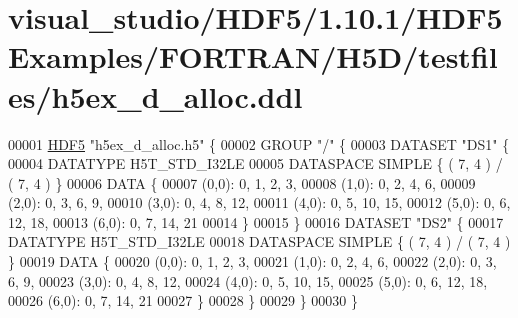 \hypertarget{visual__studio_2_h_d_f5_21_810_81_2_h_d_f5_examples_2_f_o_r_t_r_a_n_2_h5_d_2testfiles_2h5ex__d__alloc_8ddl_source}{}\section{visual\+\_\+studio/\+H\+D\+F5/1.10.1/\+H\+D\+F5\+Examples/\+F\+O\+R\+T\+R\+A\+N/\+H5\+D/testfiles/h5ex\+\_\+d\+\_\+alloc.ddl}
\label{visual__studio_2_h_d_f5_21_810_81_2_h_d_f5_examples_2_f_o_r_t_r_a_n_2_h5_d_2testfiles_2h5ex__d__alloc_8ddl_source}

\begin{DoxyCode}
00001 \hyperlink{namespace_h_d_f5}{HDF5} \textcolor{stringliteral}{"h5ex\_d\_alloc.h5"} \{
00002 GROUP \textcolor{stringliteral}{"/"} \{
00003    DATASET \textcolor{stringliteral}{"DS1"} \{
00004       DATATYPE  H5T\_STD\_I32LE
00005       DATASPACE  SIMPLE \{ ( 7, 4 ) / ( 7, 4 ) \}
00006       DATA \{
00007       (0,0): 0, 1, 2, 3,
00008       (1,0): 0, 2, 4, 6,
00009       (2,0): 0, 3, 6, 9,
00010       (3,0): 0, 4, 8, 12,
00011       (4,0): 0, 5, 10, 15,
00012       (5,0): 0, 6, 12, 18,
00013       (6,0): 0, 7, 14, 21
00014       \}
00015    \}
00016    DATASET \textcolor{stringliteral}{"DS2"} \{
00017       DATATYPE  H5T\_STD\_I32LE
00018       DATASPACE  SIMPLE \{ ( 7, 4 ) / ( 7, 4 ) \}
00019       DATA \{
00020       (0,0): 0, 1, 2, 3,
00021       (1,0): 0, 2, 4, 6,
00022       (2,0): 0, 3, 6, 9,
00023       (3,0): 0, 4, 8, 12,
00024       (4,0): 0, 5, 10, 15,
00025       (5,0): 0, 6, 12, 18,
00026       (6,0): 0, 7, 14, 21
00027       \}
00028    \}
00029 \}
00030 \}
\end{DoxyCode}
